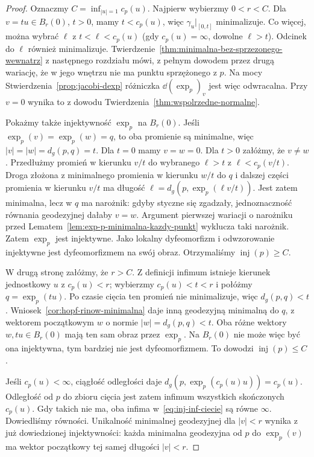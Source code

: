 \begin{proof}
Oznaczmy $C=\inf_{|u|=1}c_p(u)$.
Najpierw wybierzmy $0<r<C$.
Dla $v=tu\in B_r(0)$, $t>0$, mamy $t<c_p(u)$,
więc $\gamma_u|_{[0,t]}$ minimalizuje. Co więcej,
można wybrać $\ell$ z $t<\ell<c_p(u)$
(gdy $c_p(u)=\infty$, dowolne $\ell>t$).
Odcinek do $\ell$ również minimalizuje.
Twierdzenie~\ref{thm:minimalna-bez-sprzezonego-wewnatrz}
z następnego rozdziału mówi, z pełnym dowodem przez
drugą wariację, że w jego wnętrzu nie ma punktu
sprzężonego z $p$. Na mocy
Stwierdzenia~\ref{prop:jacobi-dexp} różniczka
$\dd(\exp_p)_v$ jest więc odwracalna.
Przy $v=0$ wynika to z dowodu
Twierdzenia~\ref{thm:wspolrzedne-normalne}.

Pokażmy także injektywność $\exp_p$ na $B_r(0)$.
Jeśli $\exp_p(v)=\exp_p(w)=q$, to oba promienie
są minimalne, więc $|v|=|w|=d_g(p,q)=t$.
Dla $t=0$ mamy $v=w=0$. Dla $t>0$ załóżmy,
że $v\ne w$. Przedłużmy promień w kierunku $v/t$
do wybranego $\ell>t$ z $\ell<c_p(v/t)$.
Droga złożona z minimalnego promienia w kierunku $w/t$
do $q$ i dalszej części promienia w kierunku $v/t$
ma długość $\ell=d_g(p,\exp_p(\ell v/t))$.
Jest zatem minimalna, lecz w $q$ ma narożnik:
gdyby styczne się zgadzały, jednoznaczność równania
geodezyjnej dałaby $v=w$. Argument pierwszej wariacji
o narożniku przed Lematem~\ref{lem:exp-p-minimalna-kazdy-punkt}
wyklucza taki narożnik. Zatem $\exp_p$ jest injektywne.
Jako lokalny dyfeomorfizm i odwzorowanie injektywne
jest dyfeomorfizmem na swój obraz. Otrzymaliśmy
$\operatorname{inj}(p)\geq C$.

W drugą stronę załóżmy, że $r>C$.
Z definicji infimum istnieje kierunek jednostkowy
$u$ z $c_p(u)<r$; wybierzmy
$c_p(u)<t<r$ i połóżmy $q=\exp_p(tu)$.
Po czasie cięcia ten promień nie minimalizuje,
więc $d_g(p,q)<t$. Wniosek~\ref{cor:hopf-rinow-minimalna}
daje inną geodezyjną minimalną do $q$,
z wektorem początkowym $w$ o normie
$|w|=d_g(p,q)<t$. Oba różne wektory
$w,tu\in B_r(0)$ mają ten sam obraz przez $\exp_p$.
Na $B_r(0)$ nie może więc być ona injektywna,
tym bardziej nie jest dyfeomorfizmem.
To dowodzi $\operatorname{inj}(p)\leq C$.

Jeśli $c_p(u)<\infty$, ciągłość odległości daje
$d_g(p,\exp_p(c_p(u)u))=c_p(u)$.
Odległość od $p$ do zbioru cięcia jest zatem
infimum wszystkich skończonych $c_p(u)$.
Gdy takich nie ma, oba infima w~\eqref{eq:inj-inf-ciecie}
są równe $\infty$. Dowiedliśmy równości.
Unikalność minimalnej geodezyjnej dla $|v|<r$
wynika z już dowiedzionej injektywności:
każda minimalna geodezyjna od $p$ do $\exp_p(v)$
ma wektor początkowy tej samej długości $|v|<r$.
\end{proof}

